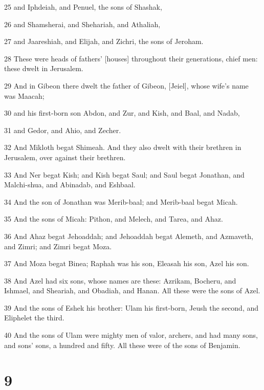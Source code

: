 \par 25 and Iphdeiah, and Penuel, the sons of Shashak,
\par 26 and Shamsherai, and Shehariah, and Athaliah,
\par 27 and Jaareshiah, and Elijah, and Zichri, the sons of Jeroham.
\par 28 These were heads of fathers' [houses] throughout their generations, chief men: these dwelt in Jerusalem.
\par 29 And in Gibeon there dwelt the father of Gibeon, [Jeiel], whose wife's name was Maacah;
\par 30 and his first-born son Abdon, and Zur, and Kish, and Baal, and Nadab,
\par 31 and Gedor, and Ahio, and Zecher.
\par 32 And Mikloth begat Shimeah. And they also dwelt with their brethren in Jerusalem, over against their brethren.
\par 33 And Ner begat Kish; and Kish begat Saul; and Saul begat Jonathan, and Malchi-shua, and Abinadab, and Eshbaal.
\par 34 And the son of Jonathan was Merib-baal; and Merib-baal begat Micah.
\par 35 And the sons of Micah: Pithon, and Melech, and Tarea, and Ahaz.
\par 36 And Ahaz begat Jehoaddah; and Jehoaddah begat Alemeth, and Azmaveth, and Zimri; and Zimri begat Moza.
\par 37 And Moza begat Binea; Raphah was his son, Eleasah his son, Azel his son.
\par 38 And Azel had six sons, whose names are these: Azrikam, Bocheru, and Ishmael, and Sheariah, and Obadiah, and Hanan. All these were the sons of Azel.
\par 39 And the sons of Eshek his brother: Ulam his first-born, Jeush the second, and Eliphelet the third.
\par 40 And the sons of Ulam were mighty men of valor, archers, and had many sons, and sons' sons, a hundred and fifty. All these were of the sons of Benjamin.

\chapter{9}


